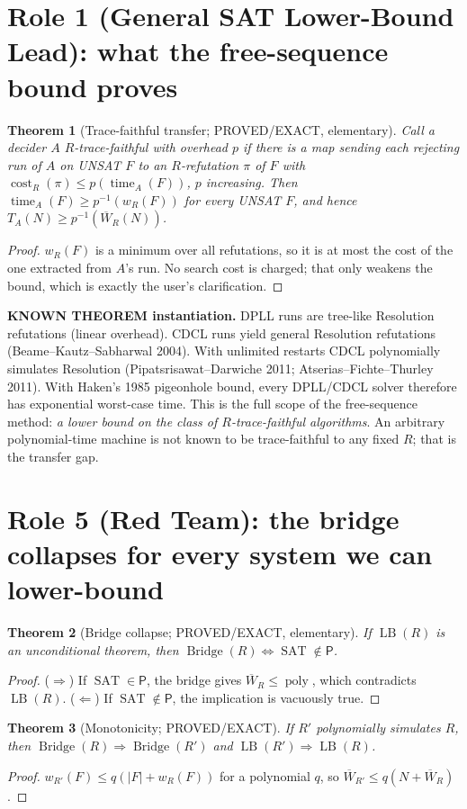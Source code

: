 \documentclass[11pt]{article}
\newtheorem{theorem}{Theorem}
\newcommand{\SAT}{\operatorname{SAT}}
\newcommand{\Wbar}{\overline W}
\begin{document}
\section{Role 1 (General SAT Lower-Bound Lead): what the free-sequence bound proves}
\begin{theorem}[Trace-faithful transfer; PROVED/EXACT, elementary]
Call a decider $A$ \emph{$R$-trace-faithful with overhead $p$} if there is a map
sending each rejecting run of $A$ on UNSAT $F$ to an $R$-refutation $\pi$ of
$F$ with $\operatorname{cost}_R(\pi)\le p(\operatorname{time}_A(F))$, $p$
increasing. Then $\operatorname{time}_A(F)\ge p^{-1}(w_R(F))$ for every UNSAT
$F$, and hence $T_A(N)\ge p^{-1}(\Wbar_R(N))$.
\end{theorem}
\begin{proof}
$w_R(F)$ is a minimum over all refutations, so it is at most the cost of the
one extracted from $A$'s run. No search cost is charged; that only weakens the
bound, which is exactly the user's clarification.
\end{proof}
\textbf{KNOWN THEOREM instantiation.} DPLL runs are tree-like Resolution
refutations (linear overhead). CDCL runs yield general Resolution refutations
(Beame--Kautz--Sabharwal 2004). With unlimited restarts CDCL polynomially
simulates Resolution (Pipatsrisawat--Darwiche 2011; Atserias--Fichte--Thurley
2011). With Haken's 1985 pigeonhole bound, every DPLL/CDCL solver therefore has
exponential worst-case time. This is the full scope of the free-sequence
method: \emph{a lower bound on the class of $R$-trace-faithful algorithms}.
An arbitrary polynomial-time machine is not known to be trace-faithful to any
fixed $R$; that is the transfer gap.

\section{Role 5 (Red Team): the bridge collapses for every system we can lower-bound}
\begin{theorem}[Bridge collapse; PROVED/EXACT, elementary]
If $\operatorname{LB}(R)$ is an unconditional theorem, then
$\operatorname{Bridge}(R)\iff\SAT\notin\mathsf P$.
\end{theorem}
\begin{proof}
($\Rightarrow$) If $\SAT\in\mathsf P$, the bridge gives
$\Wbar_R\le\operatorname{poly}$, which contradicts $\operatorname{LB}(R)$.
($\Leftarrow$) If $\SAT\notin\mathsf P$, the implication is vacuously true.
\end{proof}
\begin{theorem}[Monotonicity; PROVED/EXACT]
If $R'$ polynomially simulates $R$, then
$\operatorname{Bridge}(R)\Rightarrow\operatorname{Bridge}(R')$ and
$\operatorname{LB}(R')\Rightarrow\operatorname{LB}(R)$.
\end{theorem}
\begin{proof}
$w_{R'}(F)\le q(|F|+w_R(F))$ for a polynomial $q$, so $\Wbar_{R'}\le q(N+\Wbar_R)$.
\end{proof}
\end{document}

